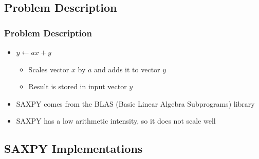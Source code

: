 \documentclass[xcolor=dvipsnames]{beamer}
\begin{document}
	\subsection{Problem Description}
		\begin{frame} \frametitle{Problem Description}
            \begin{itemize}
                \item $y \leftarrow ax + y$
                    \begin{itemize}
                        \item Scales vector $x$ by $a$ and adds it to vector 
                        $y$ 
                        \item Result is stored in input vector $y$
                    \end{itemize}
                \item SAXPY comes from the BLAS (Basic Linear Algebra 
                Subprograms) library
                \item SAXPY has a low arithmetic intensity, so it does not 
                scale well
            \end{itemize}
		\end{frame}
	
	\subsection{SAXPY Implementations}
\end{document}
